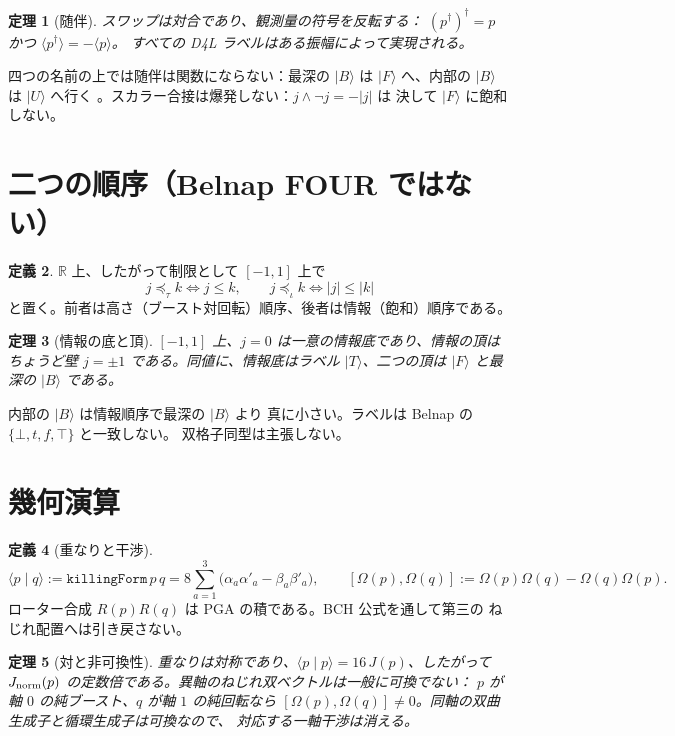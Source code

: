 \documentclass[dvipdfmx,11pt,a4paper]{article}
\newtheorem{theorem}{定理}[section]
\theoremstyle{definition}
\newtheorem{definition}[theorem]{定義}
\theoremstyle{remark}
\newcommand{\Jnorm}{J_{\rm norm}}
\begin{document}
\begin{theorem}[随伴]
\label{thm:adjoint}
スワップは対合であり、観測量の符号を反転する：
\((p^\dagger)^\dagger=p\) かつ \(\langle p^\dagger\rangle=-\langle p\rangle\)。
すべての D4L ラベルはある振幅によって実現される。
\end{theorem}

四つの名前の上では随伴は関数にならない：最深の \(\lvert B\rangle\) は
\(\lvert F\rangle\) へ、内部の \(\lvert B\rangle\) は \(\lvert U\rangle\)
へ行く \cite{D4L2026}。スカラー合接は爆発しない：\(j\wedge\neg j=-|j|\) は
決して \(\lvert F\rangle\) に飽和しない。

\section{二つの順序（Belnap FOUR ではない）}

\begin{definition}
\(\mathbb{R}\) 上、したがって制限として \([-1,1]\) 上で
\[
j\preceq_\tau k \iff j\le k,
\qquad
j\preceq_\iota k \iff \lvert j\rvert\le\lvert k\rvert
\]
と置く。前者は高さ（ブースト対回転）順序、後者は情報（飽和）順序である。
\end{definition}

\begin{theorem}[情報の底と頂]
\label{thm:info}
\([-1,1]\) 上、\(j=0\) は一意の情報底であり、情報の頂はちょうど壁
\(j=\pm 1\) である。同値に、情報底はラベル \(\lvert T\rangle\)、二つの頂は
\(\lvert F\rangle\) と最深の \(\lvert B\rangle\) である。
\end{theorem}

内部の \(\lvert B\rangle\) は情報順序で最深の \(\lvert B\rangle\) より
真に小さい。ラベルは Belnap の \(\{\bot,t,f,\top\}\) と一致しない。
双格子同型は主張しない。

\section{幾何演算}

\begin{definition}[重なりと干渉]
\[
\langle p\mid q\rangle := \texttt{killingForm}\,p\,q
= 8\sum_{a=1}^3\bigl(\alpha_a\alpha'_a-\beta_a\beta'_a\bigr),
\qquad
[\Omega(p),\Omega(q)] := \Omega(p)\Omega(q)-\Omega(q)\Omega(p).
\]
ローター合成 \(R(p)R(q)\) は PGA の積である。BCH 公式を通して第三の
ねじれ配置へは引き戻さない。
\end{definition}

\begin{theorem}[対と非可換性]
\label{thm:geo}
重なりは対称であり、\(\langle p\mid p\rangle=16\,J(p)\)、したがって
\(\Jnorm(p)\) の定数倍である。異軸のねじれ双ベクトルは一般に可換でない：
\(p\) が軸 \(0\) の純ブースト、\(q\) が軸 \(1\) の純回転なら
\([\Omega(p),\Omega(q)]\ne 0\)。同軸の双曲生成子と循環生成子は可換なので、
対応する一軸干渉は消える。
\end{theorem}
\end{document}
